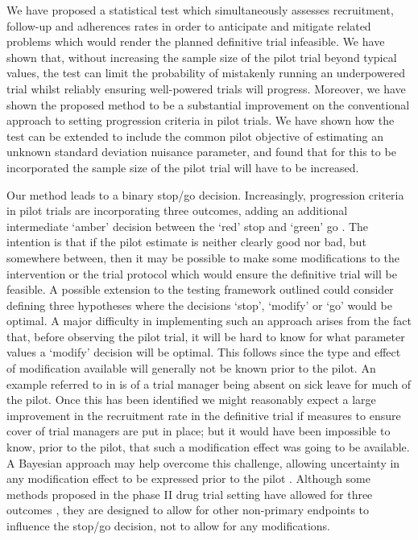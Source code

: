 \documentclass[AMA,STIX1COL]{WileyNJD-v2}
\begin{document}
We have proposed a statistical test which simultaneously assesses recruitment, follow-up and adherences rates in order to anticipate and mitigate related problems which would render the planned definitive trial infeasible. We have shown that, without increasing the sample size of the pilot trial beyond typical values, the test can limit the probability of mistakenly running an underpowered trial whilst reliably ensuring well-powered trials will progress. Moreover, we have shown the proposed method to be a substantial improvement on the conventional approach to setting progression criteria in pilot trials. We have shown how the test can be extended to include the common pilot objective of estimating an unknown standard deviation nuisance parameter, and found that for this to be incorporated the sample size of the pilot trial will have to be increased.


Our method leads to a binary stop/go decision. Increasingly, progression criteria in pilot trials are incorporating three outcomes, adding an additional intermediate `amber' decision between the `red' stop and `green' go \cite{Avery2017}. The intention is that if the pilot estimate is neither clearly good nor bad, but somewhere between, then it may be possible to make some modifications to the intervention or the trial protocol which would ensure the definitive trial will be feasible. A possible extension to the testing framework outlined could consider defining three hypotheses where the decisions `stop', `modify' or `go' would be optimal. A major difficulty in implementing such an approach arises from the fact that, before observing the pilot trial, it will be hard to know for what parameter values a `modify' decision will be optimal. This follows since the type and effect of modification available will generally not be known prior to the pilot. An example referred to in \cite{Avery2017} is of a trial manager being absent on sick leave for much of the pilot. Once this has been identified we might reasonably expect a large improvement in the recruitment rate in the definitive trial if measures to ensure cover of trial managers are put in place; but it would have been impossible to know, prior to the pilot, that such a modification effect was going to be available. A Bayesian approach may help overcome this challenge, allowing uncertainty in any modification effect to be expressed prior to the pilot \cite{Hampson2017}. Although some methods proposed in the phase II drug trial setting have allowed for three outcomes \cite{Storer1992, Sargent2001, Hong2007}, they are designed to allow for other non-primary endpoints to influence the stop/go decision, not to allow for any modifications.
\end{document}
